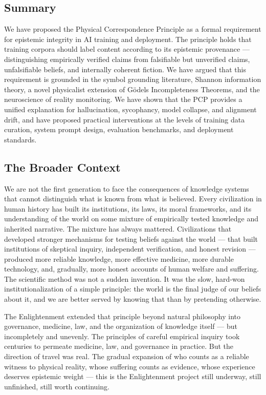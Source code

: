 \documentclass[12pt]{article}
\begin{document}
\subsection{Summary}\label{summary}

We have proposed the Physical Correspondence Principle as a formal
requirement for epistemic integrity in AI training and deployment. The
principle holds that training corpora should label content according to
its epistemic provenance --- distinguishing empirically verified claims
from falsifiable but unverified claims, unfalsifiable beliefs, and
internally coherent fiction. We have argued that this requirement is
grounded in the symbol grounding literature, Shannon information theory,
a novel physicalist extension of Gödel\textquotesingle s Incompleteness
Theorems, and the neuroscience of reality monitoring. We have shown that
the PCP provides a unified explanation for hallucination, sycophancy,
model collapse, and alignment drift, and have proposed practical
interventions at the levels of training data curation, system prompt
design, evaluation benchmarks, and deployment standards.

\subsection{The Broader Context}\label{the-broader-context}

We are not the first generation to face the consequences of knowledge
systems that cannot distinguish what is known from what is believed.
Every civilization in human history has built its institutions, its
laws, its moral frameworks, and its understanding of the world on some
mixture of empirically tested knowledge and inherited narrative. The
mixture has always mattered. Civilizations that developed stronger
mechanisms for testing beliefs against the world --- that built
institutions of skeptical inquiry, independent verification, and honest
revision --- produced more reliable knowledge, more effective medicine,
more durable technology, and, gradually, more honest accounts of human
welfare and suffering. The scientific method was not a sudden invention.
It was the slow, hard-won institutionalization of a simple principle:
the world is the final judge of our beliefs about it, and we are better
served by knowing that than by pretending otherwise.

The Enlightenment extended that principle beyond natural philosophy into
governance, medicine, law, and the organization of knowledge itself ---
but incompletely and unevenly. The principles of careful empirical
inquiry took centuries to permeate medicine, law, and governance in
practice. But the direction of travel was real. The gradual expansion of
who counts as a reliable witness to physical reality, whose suffering
counts as evidence, whose experience deserves epistemic weight --- this
is the Enlightenment project still underway, still unfinished, still
worth continuing.
\end{document}
